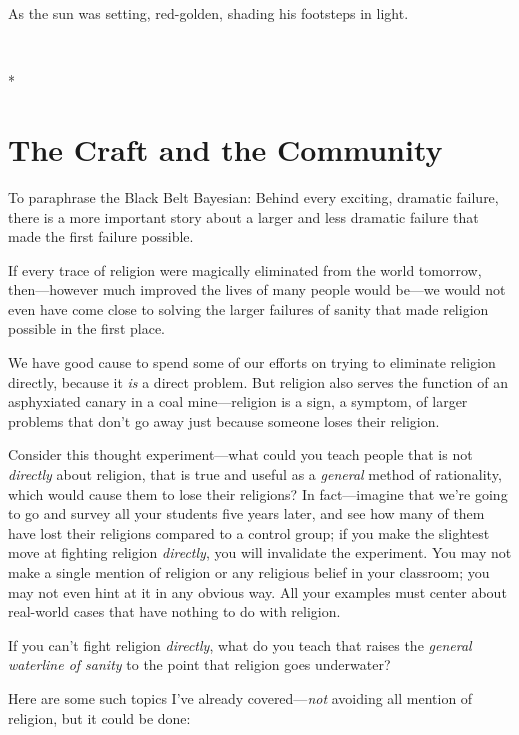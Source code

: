 {
 As the sun was setting, red-golden, shading his footsteps in
light.}

{\centering
 \ ~
\par}

{\centering
 *
\par}

\chapter{The Craft and the Community}


{
 To paraphrase the Black Belt Bayesian: Behind every exciting,
dramatic failure, there is a more important story about a larger and
less dramatic failure that made the first failure possible. }

{
 If every trace of religion were magically eliminated from the
world tomorrow, then---however much improved the lives of many people
would be---we would not even have come close to solving the larger
failures of sanity that made religion possible in the first place.}

{
 We have good cause to spend some of our efforts on trying to
eliminate religion directly, because it \textit{is} a direct problem.
But religion also serves the function of an asphyxiated canary in a
coal mine---religion is a sign, a symptom, of larger problems that
don't go away just because someone loses their
religion.}

{
 Consider this thought experiment---what could you teach people
that is not \textit{directly} about religion, that is true and useful
as a \textit{general} method of rationality, which would cause them to
lose their religions? In fact---imagine that we're
going to go and survey all your students five years later, and see how
many of them have lost their religions compared to a control group; if
you make the slightest move at fighting religion \textit{directly}, you
will invalidate the experiment. You may not make a single mention of
religion or any religious belief in your classroom; you may not even
hint at it in any obvious way. All your examples must center about
real-world cases that have nothing to do with religion.}

{
 If you can't fight religion \textit{directly},
what do you teach that raises the \textit{general waterline of sanity}
to the point that religion goes underwater?}

{
 Here are some such topics I've already
covered---\textit{not} avoiding all mention of religion, but it could
be done:}

